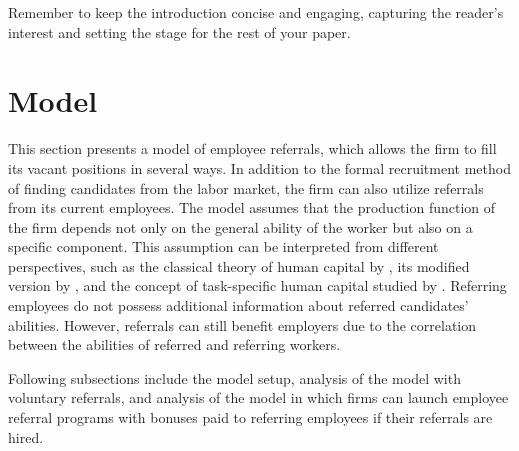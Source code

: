 \documentclass[12pt]{article}
\begin{document}
Remember to keep the introduction concise and engaging, capturing the reader's interest and setting the stage for the rest of your paper.


\section{Model} \label{sec:model}
This section presents a model of employee referrals, which allows the firm to fill its vacant positions in several ways. In addition to the formal recruitment method of finding candidates from the labor market, the firm can also utilize referrals from its current employees. The model assumes that the production function of the firm depends not only on the general ability of the worker but also on a specific component. This assumption can be interpreted from different perspectives, such as the classical theory of human capital by \cite{becker1962investment}, its modified version by \cite{lazear2009firm}, and the concept of task-specific human capital studied by \cite{gibbons2004task}. Referring employees do not possess additional information about referred candidates' abilities. However, referrals can still benefit employers due to the correlation between the abilities of referred and referring workers. 

Following subsections include the model setup, analysis of the model with voluntary referrals, and analysis of the model in which firms can launch employee referral programs with bonuses paid to referring employees if their referrals are hired. 
\end{document}
